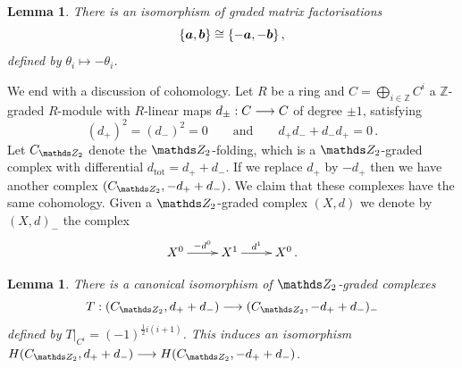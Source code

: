 \documentclass{compositio}
\newtheorem{lemma}[theorem]{Lemma}
\theoremstyle{definition}
\numberwithin{equation}{section}
\begin{document}
\begin{lemma}\label{lemma:cyclickos3} There is an isomorphism of graded matrix factorisations
\[
\{ \boldsymbol{a}, \boldsymbol{b} \} \cong \{ -\boldsymbol{a}, - \boldsymbol{b} \}\,,
\]
defined by $\theta_i \longmapsto - \theta_i$.
\end{lemma}

We end with a discussion of cohomology. Let $R$ be a ring and $C = \bigoplus_{i \in \mathds{Z}} C^i$ a $\mathds{Z}$-graded $R$-module with $R$-linear maps $d_{\pm}: C \longrightarrow C$ of degree $\pm 1$, satisfying
\[
(d_+)^2 = (d_{-})^2 = 0 \qquad \text{and} \qquad d_{+}d_{-} + d_{-}d_{+} = 0 \, .
\]
Let $C_{\Ztwo}$ denote the $\Ztwo$-folding, which is a $\Ztwo$-graded complex with differential $d_{\text{tot}} = d_+ + d_{-}$. If we replace $d_{+}$ by $-d_{+}$ then we have another complex $(C_{\Ztwo}, -d_{+} + d_{-})$. We claim that these complexes have the same cohomology. Given a $\Ztwo$-graded complex $(X,d)$ we denote by $(X,d)_{-}$ the complex
\[
\xymatrix{%
X^0 \ar[r]^-{-d^0} & X^1 \ar[r]^-{d^1} & X^0\,.
}
\]

\begin{lemma}\label{lemma:cyclickoszulsign} There is a canonical isomorphism of $\Ztwo$-graded complexes
\[
T: (C_{\Ztwo}, d_{+} + d_{-}) \lto (C_{\Ztwo}, -d_{+} + d_{-})_{-}
\]
defined by $T|_{C^i} = (-1)^{\frac{1}{2}i(i+1)}$. This induces an isomorphism $H(C_{\Ztwo}, d_{+} + d_{-}) \lto H(C_{\Ztwo}, -d_{+} + d_{-})$.
\end{lemma}
\end{document}
